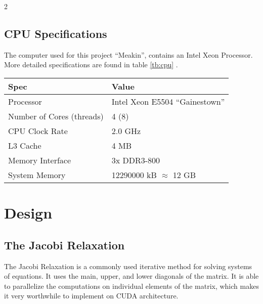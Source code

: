 \documentclass[10pt]{article}
\begin{document}
\begin{multicols}{2}
  \subsection{CPU Specifications}
  The computer used for this project ``Meakin'', contains an Intel Xeon Processor. More detailed specifications are found in table \ref{tb:cpu} \cite{bib:xeon_wiki}.
  \begin{table*}[!ht]\centering
    \begin{tabular}{@{}l l@{}}\toprule
      \bf{Spec}                     &   \bf{Value}                      \\
      \hline
      Processor                     &   Intel Xeon E5504 ``Gainestown'' \\
      Number of Cores (threads)     &   4 (8)                           \\
      CPU Clock Rate                &   2.0 GHz                         \\
      L3 Cache                      &   4 MB                            \\
      Memory Interface              &   3x DDR3-800                     \\
      System Memory                 &   12290000 kB $\approx$ 12 GB     \\
      \hline
    \end{tabular}
    \caption{Meakin CPU specifications}
    \label{tb:cpu}
  \end{table*}

  \section{Design}
  \label{sec:design}
  \subsection{The Jacobi Relaxation}
  The Jacobi Relaxation is a commonly used iterative method for solving systems of equations.
  It uses the main, upper, and lower diagonals of the matrix.
  It is able to parallelize the computations on individual elements of the matrix, which makes it very worthwhile to implement on CUDA architecture.


\end{multicols}
\end{document}
